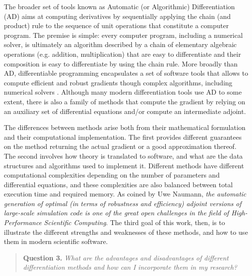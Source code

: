 The broader set of tools known as Automatic (or Algorithmic) Differentiation (AD) aims at computing derivatives by sequentially applying the chain (and product) rule to the sequence of unit operations that constitute a computer program\cite{Griewank:2008kh, Naumann.2011}. 
The premise is simple: every computer program, including a numerical solver, is ultimately an algorithm described by a chain of elementary algebraic operations (e.g. addition, multiplication) that are easy to differentiate and their composition is easy to differentiate by using the chain rule\cite{Giering:1998in}. 
More broadly than AD, differentiable programming encapsulates a set of software tools that allows to compute efficient and robust gradients though complex algorithms, including numerical solvers \cite{Innes_Zygote}. 
Although many modern differentiation tools use AD to some extent, there is also a family of methods that compute the gradient by relying on an auxiliary set of differential equations and/or compute an intermediate adjoint. 

The differences between methods arise both from their mathematical formulation and their computational implementation. 
The first provides different guarantees on the method returning the actual gradient or a good approximation thereof. 
The second involves how theory is translated to software, and what are the data structures and algorithms used to implement it. 
Different methods have different computational complexities depending on the number of parameters and differential equations, and these complexities are also balanced between total execution time and required memory. 
As coined by Uwe Naumann, \textit{the automatic generation of optimal (in terms of robustness and efficiency) adjoint versions of large-scale simulation code is one of the great open challenges in the field of High-Performance Scientific Computing}\cite{Naumann.2011}.
The third goal of this work, then, is to illustrate the different strengths and weaknesses of these methods, and how to use them in modern scientific software. 
\begin{quote}
    \textbf{Question 3. }
    \textit{What are the advantages and disadvantages of different differentiation methods and how can I incorporate them in my research?}
\end{quote}

